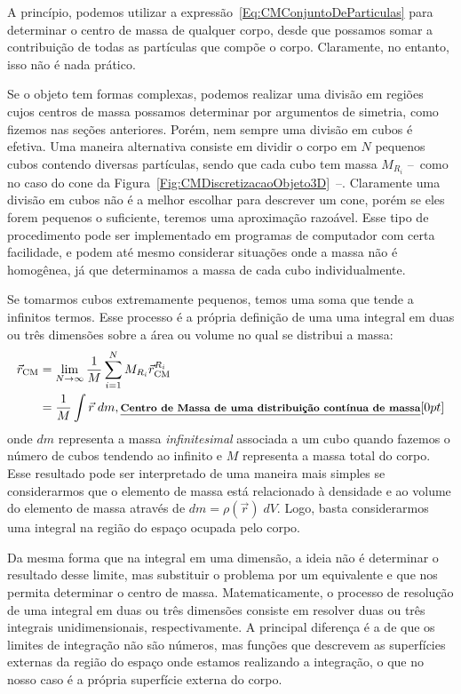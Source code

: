 A princípio, podemos utilizar a expressão~\eqref{Eq:CMConjuntoDeParticulas} para determinar o centro de massa de qualquer corpo, desde que possamos somar a contribuição de todas as partículas que compõe o corpo. Claramente, no entanto, isso não é nada prático. 

Se o objeto tem formas complexas, podemos realizar uma divisão em regiões cujos centros de massa possamos determinar por argumentos de simetria, como fizemos nas seções anteriores. Porém, nem sempre uma divisão em cubos é efetiva. Uma maneira alternativa consiste em dividir o corpo em $N$ pequenos cubos contendo diversas partículas, sendo que cada cubo tem massa $M_{R_i}$ --~como no caso do cone da Figura~\ref{Fig:CMDiscretizacaoObjeto3D}~--. Claramente uma divisão em cubos não é a melhor escolhar para descrever um cone, porém se eles forem pequenos o suficiente, teremos uma aproximação razoável. Esse tipo de procedimento pode ser implementado em programas de computador com certa facilidade, e podem até mesmo considerar situações onde a massa não é homogênea, já que determinamos a massa de cada cubo individualmente.

Se tomarmos cubos extremamente pequenos, temos uma soma que tende a infinitos termos. Esse processo é a própria definição de uma uma integral em duas ou três dimensões sobre a área ou volume no qual se distribui a massa:
\begin{align}\label{Eq:CMDistContinua}
  \vec{r}_{\textrm{CM}} &= \lim_{N \to \infty} \frac{1}{M} \sum_{i = 1}^N M_{R_i} \vec{r}_{\rm{CM}}^{R_i} \\
  &= \frac{1}{M} \int \vec{r} \; dm, \relax{\footnotesize\emph{\textbf{Centro de Massa de uma distribuição contínua de massa}}}[0pt]
\end{align}
%
onde $dm$ representa a massa \emph{infinitesimal} associada a um cubo quando fazemos o número de cubos tendendo ao infinito e $M$ representa a massa total do corpo. Esse resultado pode ser interpretado de uma maneira mais simples se considerarmos que o elemento de massa está relacionado à densidade e ao volume do elemento de massa através de $dm = \rho(\vec{r}) \; dV$. Logo, basta considerarmos uma integral na região do espaço ocupada pelo corpo.

Da mesma forma que na integral em uma dimensão, a ideia não é determinar o resultado desse limite, mas substituir o problema por um equivalente e que nos permita determinar o centro de massa. Matematicamente, o processo de resolução de uma integral em duas ou três dimensões consiste em resolver duas ou três integrais unidimensionais, respectivamente. A principal diferença é a de que os limites de integração não são números, mas funções que descrevem as superfícies externas da região do espaço onde estamos realizando a integração, o que no nosso caso é a própria superfície externa do corpo.


